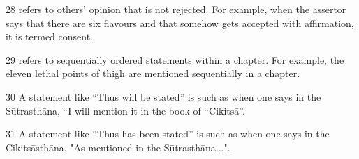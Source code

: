 \begin{translation}
\item [28]  refers to others' opinion that is not rejected. For example, when the assertor says that there are six flavours and that somehow gets accepted with affirmation, it is termed consent.

\item [29]  refers to sequentially ordered statements within a chapter. For example, the eleven lethal points of thigh are mentioned sequentially in a chapter.

\item [30] A statement like “Thus will be stated” is  such as when one says in the Sūtrasthāna, “I will mention it in the book of “Cikitsā”. 

\item [31] A statement like “Thus has been stated” is  such as when one says in the Cikitsāsthāna, "As mentioned in the Sūtrasthāna...". 

\end{translation}
